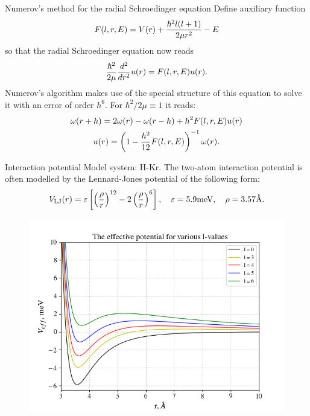 \documentclass[10pt,pdf,hyperref={unicode}]{beamer}
\newcommand{\lb}{\left(}
\newcommand{\rb}{\right)}
\begin{document}
\begin{frame}{Numerov's method for the radial Schroedinger equation}
	Define auxiliary function 
	\begin{gather}
		F(l, r, E) = V(r) + \frac{\hbar^2 l(l + 1)}{2 \mu r^2} - E \notag
	\end{gather}
	so that the radial Schroedinger equation now reads
	\begin{gather}
		\frac{\hbar^2}{2 \mu} \frac{d^2}{dr^2} u(r) = F(l, r, E) u(r). \notag
	\end{gather}
	Numerov's algorithm makes use of the special structure of this equation to solve it with an error of order $h^6$. For $\hbar^2/2\mu \equiv 1$ it reads:
	\begin{gather}
		\omega(r + h) = 2 \omega(r) - \omega(r - h) + h^2 F(l, r, E) u(r) \notag \\
		u(r) = \lb 1 - \frac{h^2}{12} F(l, r, E) \rb^{-1} \omega(r). \notag
	\end{gather}
\end{frame}

\begin{frame}{Interaction potential}
	Model system: H-Kr. The two-atom interaction potential is often modelled by the Lennard-Jones potential of the following form:
	\begin{gather}
			V_{\text{LJ}}(r) = \varepsilon \left[ \lb \frac{\rho}{r} \rb^{12} - 2 \lb \frac{\rho}{r} \rb^6 \right], \quad \varepsilon = 5.9 \text{meV}, \quad \rho = 3.57 \textup{\AA}. \notag 
	\end{gather}
	\vspace*{-1cm}
	\begin{figure}
		\includegraphics[scale = 0.35]{../numerov_LJ/pictures/effective_potential.png}
	\end{figure}
\end{frame}
\end{document}
